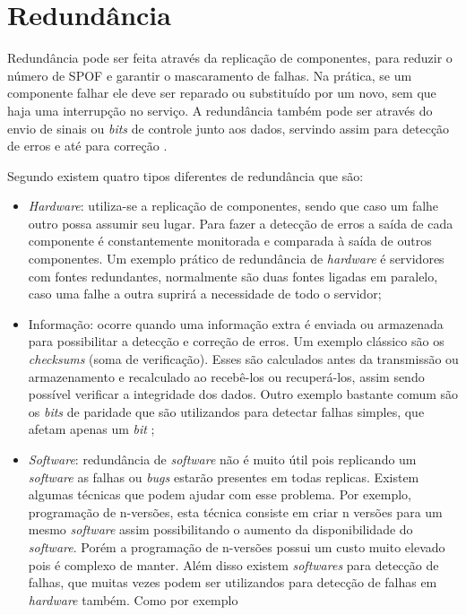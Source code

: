 \section{Redundância}
\label{section:redundancia}

Redundância pode ser feita através da replicação de componentes, para reduzir o número de SPOF e garantir o mascaramento de falhas.
Na prática, se um componente falhar ele deve ser reparado ou substituído por um novo, sem que haja uma interrupção no serviço.
A redundância também pode ser através do envio de sinais ou \textit{bits} de controle junto aos dados, 
servindo assim para detecção de erros e até para correção \cite{weber2002}.

Segundo \cite{norvag2000} existem quatro tipos diferentes de redundância que são:
\begin{itemize}
 \item \textit{Hardware}: utiliza-se a replicação de componentes, sendo que caso um falhe outro possa assumir seu lugar. 
 Para fazer a detecção de erros a saída de cada componente é constantemente monitorada e comparada à saída de outros componentes.
 Um exemplo prático de redundância de \textit{hardware} é servidores com fontes redundantes, normalmente são duas fontes ligadas em paralelo, 
 caso uma falhe a outra suprirá a necessidade de todo o servidor;
 \item Informação: ocorre quando uma informação extra é enviada ou armazenada para possibilitar a detecção e correção de erros.
 Um exemplo clássico são os \textit{checksums} (soma de verificação). Esses são calculados antes da transmissão ou armazenamento 
 e recalculado ao recebê-los ou recuperá-los, assim sendo possível verificar a integridade dos dados. Outro exemplo bastante comum são os 
 \textit{bits} de paridade que são utilizandos para detectar falhas simples, que afetam apenas um \textit{bit} \cite{weber2002};
 \item \textit{Software}: redundância de \textit{software} não é muito útil pois replicando um \textit{software} as falhas ou 
 \textit{bugs} estarão presentes em todas replicas. Existem algumas técnicas que podem ajudar com esse problema. Por exemplo, programação 
 de n-versões, esta técnica consiste em criar n versões para um mesmo \textit{software} assim possibilitando o aumento da disponibilidade do 
 \textit{software}. Porém a programação de n-versões possui um custo muito elevado pois é complexo de manter. Além disso existem \textit{softwares} 
 para detecção de falhas, que muitas vezes podem ser utilizandos para detecção de falhas em \textit{hardware} também. Como por exemplo 

\end{itemize}
